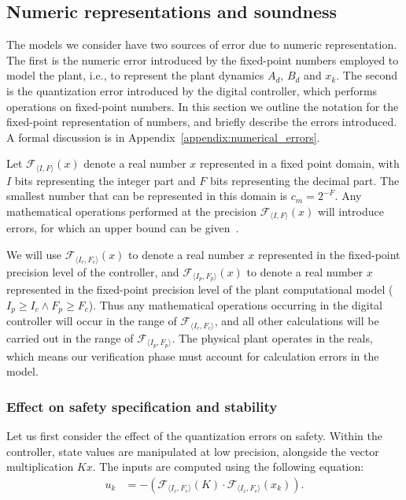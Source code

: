\documentclass[runningheads,a4paper]{llncs}
\begin{document}
\subsection{Numeric representations and soundness} 
\label{sec:numeric_rep}


The models we consider have two sources of error due to numeric
representation.  The first is the numeric error introduced by the
fixed-point numbers employed to model the plant, i.e., to represent the
plant dynamics $A_d$, $B_d$ and $x_k$.  The second is the quantization error
introduced by the digital controller, which performs operations on
fixed-point numbers.  In this section we outline the notation for the
fixed-point representation of numbers, and briefly describe the errors
introduced.  A formal discussion is in
Appendix~\ref{appendix:numerical_errors}.

Let $\mathcal{F}_{\langle I,F \rangle}(x)$ denote a real number $x$
represented in a fixed point domain, with $I$ bits representing the integer
part and $F$ bits representing the decimal part.  The smallest number that
can be represented in this domain is $c_m=2^{-F}$.  Any mathematical
operations performed at the precision $\mathcal{F}_{\langle I,F \rangle}(x)$
will introduce errors, for which an upper bound can be
given~\cite{DBLP:conf/arith/BrainTRW15}.

We will use $\mathcal{F}_{\langle I_c,F_c \rangle}(x)$ to denote a real
number $x$ represented in the fixed-point precision level of the controller,
and $\mathcal{F}_{\langle I_p,F_p \rangle}(x)$ to denote a real number $x$
represented in the fixed-point precision level of the plant computational
model ($I_p \geq I_c \wedge F_p \geq F_c$).  Thus any mathematical
operations occurring in the digital controller will occur in the range of
$\mathcal{F}_{\langle I_c,F_c \rangle}$, and all other calculations will be
carried out in the range of $\mathcal{F}_{\langle I_p,F_p \rangle}$.  The
physical plant operates in the reals, which means our verification phase
must account for calculation errors in the model.

\subsubsection{Effect on safety specification and stability}

Let us first consider the effect of the quantization errors on safety. 
Within the controller, state values are manipulated at low precision,
alongside the vector multiplication $Kx$.
%
The inputs are computed using the following equation: 
%
\begin{align*}
u_{k}&=-(\mathcal{F}_{\langle I_c,F_c \rangle}(K)\cdot\mathcal{F}_{\langle I_c,F_c \rangle}(x_{k})). 
\end{align*}
\end{document}
